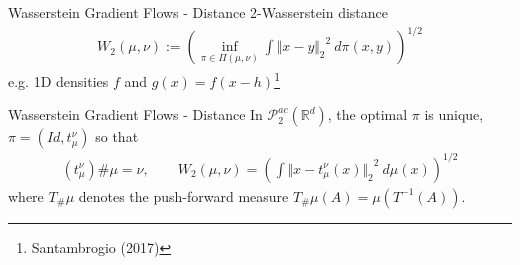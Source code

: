 \documentclass[aspectratio=149]{beamer}
\def\real{\mathbb{R}}
\newcommand{\norm}[2]{\ensuremath{\Vert #1 \Vert_{#2}}}
\begin{document}
\begin{frame}{Wasserstein Gradient Flows - Distance}
2-Wasserstein distance
\begin{align*}
W_{2}(\mu,\nu):=\left(\inf_{\pi\in\Pi(\mu,\nu)}\int\norm{x-y}{2}^{2}\ d\pi(x,y)\right)^{1/2}
\end{align*}
\pause
e.g. 1D densities $f$ and $g(x)=f(x-h)$\footnote{Santambrogio (2017)}
\begin{figure}
\centering
{}
\end{figure}

\end{frame}

\begin{frame}{Wasserstein Gradient Flows - Distance}
In $\mathcal{P}_{2}^{ac}(\real^{d})$, the optimal $\pi$ is unique, $\pi=(Id, t_\mu^\nu)$ so that
\begin{align*}
(t_{\mu}^{\nu}){\#}\mu=\nu,\qquad W_{2}(\mu,\nu)=\left(\int\norm{x-t_{\mu}^{\nu}(x)}{2}^{2}\ d\mu(x)\right)^{1/2}
\end{align*}
where $T_{\#}\mu$ denotes the push-forward measure $T_{\#}\mu(A)=\mu(T^{-1}(A))$.
\end{frame}
\end{document}
